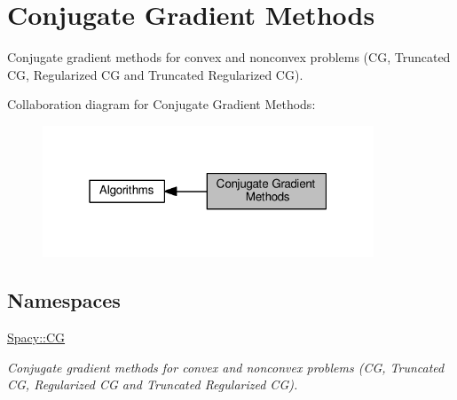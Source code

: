 \hypertarget{group__CGGroup}{}\section{Conjugate Gradient Methods}
\label{group__CGGroup}


Conjugate gradient methods for convex and nonconvex problems (C\+G, Truncated C\+G, Regularized C\+G and Truncated Regularized C\+G).  


Collaboration diagram for Conjugate Gradient Methods\+:\nopagebreak
\begin{figure}[H]
\begin{center}
\leavevmode
\includegraphics[width=280pt]{group__CGGroup}
\end{center}
\end{figure}
\subsection*{Namespaces}
\begin{DoxyCompactItemize}
\item 
 \hyperlink{namespaceSpacy_1_1CG}{Spacy\+::\+C\+G}
\begin{DoxyCompactList}\small\item\em Conjugate gradient methods for convex and nonconvex problems (C\+G, Truncated C\+G, Regularized C\+G and Truncated Regularized C\+G). \end{DoxyCompactList}\end{DoxyCompactItemize}
